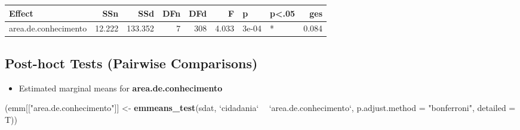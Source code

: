 \documentclass[]{article}
\newenvironment{Shaded}{\begin{snugshade}}{\end{snugshade}}
\newcommand{\DataTypeTok}[1]{\textcolor[rgb]{0.13,0.29,0.53}{#1}}
\newcommand{\KeywordTok}[1]{\textcolor[rgb]{0.13,0.29,0.53}{\textbf{#1}}}
\newcommand{\NormalTok}[1]{#1}
\newcommand{\OperatorTok}[1]{\textcolor[rgb]{0.81,0.36,0.00}{\textbf{#1}}}
\newcommand{\StringTok}[1]{\textcolor[rgb]{0.31,0.60,0.02}{#1}}
\providecommand{\tightlist}{%
  \setlength{\itemsep}{0pt}\setlength{\parskip}{0pt}}
\begin{document}
\begin{longtable}[]{@{}lrrrrrllr@{}}
\toprule
Effect & SSn & SSd & DFn & DFd & F & p & p\textless{}.05 &
ges\tabularnewline
\midrule
\endhead
area.de.conhecimento & 12.222 & 133.352 & 7 & 308 & 4.033 & 3e-04 & * &
0.084\tabularnewline
\bottomrule
\end{longtable}

\hypertarget{post-hoct-tests-pairwise-comparisons}{%
\subsection{Post-hoct Tests (Pairwise
Comparisons)}\label{post-hoct-tests-pairwise-comparisons}}

\begin{itemize}
\tightlist
\item
  Estimated marginal means for \textbf{area.de.conhecimento}
\end{itemize}

\begin{Shaded}
\begin{Highlighting}[]
\NormalTok{(emm[[}\StringTok{"area.de.conhecimento"}\NormalTok{]] <-}\StringTok{ }\KeywordTok{emmeans_test}\NormalTok{(sdat, }\StringTok{`}\DataTypeTok{cidadania}\StringTok{`} \OperatorTok{~}\StringTok{ `}\DataTypeTok{area.de.conhecimento}\StringTok{`}\NormalTok{, }\DataTypeTok{p.adjust.method =} \StringTok{"bonferroni"}\NormalTok{, }\DataTypeTok{detailed =}\NormalTok{ T))}
\end{Highlighting}
\end{Shaded}
\end{document}
